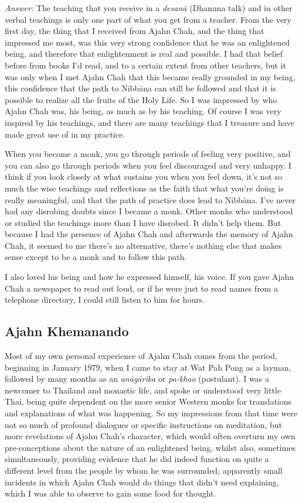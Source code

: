 \emph{Answer:} The teaching that you receive in a \emph{desanā} (Dhamma
talk) and in other verbal teachings is only one part of what you get
from a teacher. From the very first day, the thing that I received from
Ajahn Chah, and the thing that impressed me most, was this very strong
confidence that he was an enlightened being, and therefore that
enlightenment is real and possible. I had that belief before from books
I'd read, and to a certain extent from other teachers, but it was only
when I met Ajahn Chah that this became really grounded in my being, this
confidence that the path to Nibbāna can still be followed and that it is
possible to realize all the fruits of the Holy Life. So I was impressed
by who Ajahn Chah was, his being, as much as by his teaching. Of course
I was very inspired by his teachings, and there are many teachings that
I treasure and have made great use of in my practice.

When you become a monk, you go through periods of feeling very positive,
and you can also go through periods when you feel discouraged and very
unhappy. I think if you look closely at what sustains you when you feel
down, it's not so much the wise teachings and reflections as the faith
that what you're doing is really meaningful, and that the path of
practice does lead to Nibbāna. I've never had any disrobing doubts since
I became a monk. Other monks who understood or studied the teachings
more than I have disrobed. It didn't help them. But because I had the
presence of Ajahn Chah and afterwards the memory of Ajahn Chah, it
seemed to me there's no alternative, there's nothing else that makes
sense except to be a monk and to follow this path.

I also loved his being and how he expressed himself, his voice. If you
gave Ajahn Chah a newspaper to read out loud, or if he were just to read
names from a telephone directory, I could still listen to him for hours.

\subsection{Ajahn Khemanando}

Most of my own personal experience of Ajahn Chah comes from the period, 
beginning in January 1979, when I came to stay at Wat Pah Pong as a
layman, followed by many months as an \emph{anāgārika} or \emph{pa-khao}
 (postulant). I was a newcomer to Thailand and monastic life, and spoke
or understood very little Thai, being quite dependent on the more senior
Western monks for translations and explanations of what was happening. 
So my impressions from that time were not so much of profound dialogues
or specific instructions on meditation, but more revelations of Ajahn
Chah's character, which would often overturn my own pre-conceptions
about the nature of an enlightened being, whilst also, sometimes
simultaneously, providing evidence that he did indeed function on quite
a different level from the people by whom he was surrounded; apparently
small incidents in which Ajahn Chah would do things that didn't need
explaining, which I was able to observe to gain some food for thought. 

